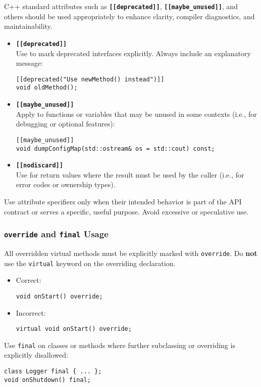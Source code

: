 C++ standard attributes such as \texttt{\textbf{[[deprecated]]}}, \texttt{\textbf{[[maybe\_unused]]}}, and others should be used appropriately to enhance clarity, compiler diagnostics, and maintainability.
\begin{itemize}\itemsep0em
  \item \textbf{\texttt{[[deprecated]]}} \\
  Use to mark deprecated interfaces explicitly. Always include an explanatory message:
  \begin{lstlisting}[style=cppstyle]
[[deprecated("Use newMethod() instead")]]
void oldMethod();
  \end{lstlisting}

  \item \textbf{\texttt{[[maybe\_unused]]}} \\
  Apply to functions or variables that may be unused in some contexts (i.e., for debugging or optional features):
  \begin{lstlisting}[style=cppstyle]
[[maybe_unused]]
void dumpConfigMap(std::ostream& os = std::cout) const;
  \end{lstlisting}

  \item \textbf{\texttt{[[nodiscard]]}} \\
  Use for return values where the result must be used by the caller (i.e., for error codes or ownership types).
\end{itemize}
Use attribute specifiers only when their intended behavior is part of the API contract or serves a specific, useful purpose. Avoid excessive or speculative use.

\subsubsection*{\texttt{override} and \texttt{final} Usage}

All overridden virtual methods must be explicitly marked with \texttt{override}. Do \textbf{not} use the \texttt{virtual} keyword on the overriding declaration.
\begin{itemize}\itemsep0em
  \item Correct:
  \begin{lstlisting}[style=cppstyle]
void onStart() override;
  \end{lstlisting}
  \item Incorrect:
  \begin{lstlisting}[style=cppstyle]
virtual void onStart() override;
  \end{lstlisting}
\end{itemize}
Use \texttt{final} on classes or methods where further subclassing or overriding is explicitly disallowed:
\begin{lstlisting}[style=cppstyle]
class Logger final { ... };
void onShutdown() final;
\end{lstlisting}


